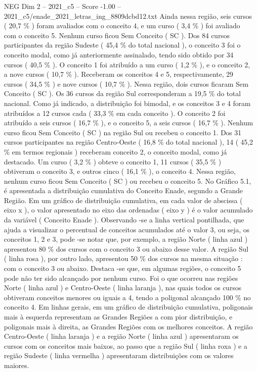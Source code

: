 \begin{textsample}{NEG Dim 2 – 2021\_c5 – Score -1.00 – 2021\_c5/enade\_2021\_letras\_ing\_8809dcbd12.txt}
Ainda nessa região, seis cursos ( 20,7 \% ) foram avaliados com o conceito 4, e um curso ( 3,4 \% ) foi avaliado com o conceito 5.
Nenhum curso ficou Sem Conceito ( SC ).
Dos 84 cursos participantes da região Sudeste ( 45,4 \% do total nacional ), o conceito 3 foi o conceito modal, como já anteriormente assinalado, tendo sido obtido por 34 cursos ( 40,5 \% ).
O conceito 1 foi atribuído a um curso ( 1,2 \% ), e o conceito 2, a nove cursos ( 10,7 \% ).
Receberam os conceitos 4 e 5, respectivamente, 29 cursos ( 34,5 \% ) e nove cursos ( 10,7 \% ).
Nessa região, dois cursos ficaram Sem Conceito ( SC ).
Os 36 cursos da região Sul corresponderam a 19,5 \% do total nacional.
Como já indicado, a distribuição foi bimodal, e os conceitos 3 e 4 foram atribuídos a 12 cursos cada ( 33,3 \% em cada conceito ).
O conceito 2 foi atribuído a seis cursos ( 16,7 \% ), e o conceito 5, a seis cursos ( 16,7 \% ).
Nenhum curso ficou Sem Conceito ( SC ) na região Sul ou recebeu o conceito 1.
Dos 31 cursos participantes na região Centro-Oeste ( 16,8 \% do total nacional ), 14 ( 45,2 \% em termos regionais ) receberam conceito 2, o conceito modal, como já destacado.
Um curso ( 3,2 \% ) obteve o conceito 1, 11 cursos ( 35,5 \% ) obtiveram o conceito 3, e outros cinco ( 16,1 \% ), o conceito 4.
Nessa região, nenhum curso ficou Sem Conceito ( SC ) ou recebeu o conceito 5.
No Gráfico 5.1, é apresentada a distribuição cumulativa do Conceito Enade, segundo a Grande Região.
Em um gráfico de distribuição cumulativa, em cada valor de abscissa ( eixo x ), o valor apresentado no eixo das ordenadas ( eixo y ) é o valor acumulado da variável ( Conceito Enade ).
Observando -se a linha vertical pontilhada, que ajuda a visualizar o percentual de conceitos acumulados até o valor 3, ou seja, os conceitos 1, 2 e 3, pode -se notar que, por exemplo, a região Norte ( linha azul ) apresentou 80 \% dos cursos com o conceito 3 ou abaixo desse valor.
A região Sul ( linha rosa ), por outro lado, apresentou 50 \% dos cursos na mesma situação : com o conceito 3 ou abaixo.
Destaca -se que, em algumas regiões, o conceito 5 pode não ter sido alcançado por nenhum curso.
Foi o que ocorreu nas regiões Norte ( linha azul ) e Centro-Oeste ( linha laranja ), nas quais todos os cursos obtiveram conceitos menores ou iguais a 4, tendo a poligonal alcançado 100 \% no conceito 4.
Em linhas gerais, em um gráfico de distribuição cumulativa, poligonais mais à esquerda representam as Grandes Regiões a com pior distribuição, e poligonais mais à direita, as Grandes Regiões com os melhores conceitos.
A região Centro-Oeste ( linha laranja ) e a região Norte ( linha azul ) apresentaram os cursos com os conceitos mais baixos, ao passo que a região Sul ( linha roxa ) e a região Sudeste ( linha vermelha ) apresentaram distribuições com os valores maiores.

\end{textsample}

